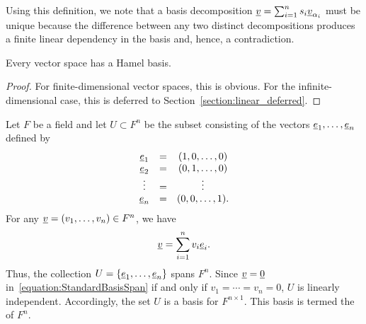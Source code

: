Using this definition, we note that a basis decomposition $\underline{v} = \sum_{i=1}^n s_i \underline{v}_{\alpha_i}$ must be unique because the difference between any two distinct decompositions produces a finite linear dependency in the basis and, hence, a contradiction.

\begin{theorem} \label{theorem:hamel_basis}
Every vector space has a Hamel basis.
\end{theorem}
\begin{proof}
For finite-dimensional vector spaces, this is obvious.
For the infinite-dimensional case, this is deferred to Section~\ref{section:linear_deferred}.
\end{proof}

\begin{example}
Let $F$ be a field and let $U \subset F^n$ be the subset consisting of the vectors $\underline{e}_1, \ldots, \underline{e}_n$ defined by
\begin{equation*}
\begin{array}{ccc}
\underline{e}_1 & = & (1, 0, \ldots, 0) \\
\underline{e}_2 & = & (0, 1, \ldots, 0) \\
\vdots & = & \vdots \\
\underline{e}_n & = & (0, 0, \ldots, 1).
\end{array}
\end{equation*}
For any $\underline{v} = (v_1, \ldots, v_n) \in F^n$, we have
\begin{equation} \label{equation:StandardBasisSpan}
\underline{v} = \sum_{i=1}^n v_i \underline{e}_i.
\end{equation}
Thus, the collection $U = \left\{ \underline{e}_1, \ldots, \underline{e}_n \right\}$ spans $F^n$.
Since $\underline{v} = \underline{0}$ in~\eqref{equation:StandardBasisSpan} if and only if $v_1 = \cdots = v_n = 0$, $U$ is linearly independent.
Accordingly, the set $U$ is a basis for $F^{n \times 1}$.
This basis is termed the  of $F^n$.
\end{example}


